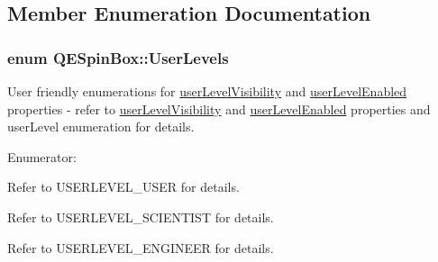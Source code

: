 \subsection{Member Enumeration Documentation}
\hypertarget{classQESpinBox_a27e69a31dc1ff8835542c057926b3eed}{
\subsubsection[{UserLevels}]{\setlength{\rightskip}{0pt plus 5cm}enum {\bf QESpinBox::UserLevels}}}
\label{classQESpinBox_a27e69a31dc1ff8835542c057926b3eed}
User friendly enumerations for \hyperlink{classQESpinBox_a36b8c4b73a3f918f967a45e370d53249}{userLevelVisibility} and \hyperlink{classQESpinBox_ab767d9e77fd21f19ad60ffc107f57253}{userLevelEnabled} properties -\/ refer to \hyperlink{classQESpinBox_a36b8c4b73a3f918f967a45e370d53249}{userLevelVisibility} and \hyperlink{classQESpinBox_ab767d9e77fd21f19ad60ffc107f57253}{userLevelEnabled} properties and userLevel enumeration for details. \begin{Desc}
\item[Enumerator: ]\par
\begin{description}
\item[{\em 
\hypertarget{classQESpinBox_a27e69a31dc1ff8835542c057926b3eeda238f8727a9ac147ae3a162e1f2dbd6c8}{
User}
\label{classQESpinBox_a27e69a31dc1ff8835542c057926b3eeda238f8727a9ac147ae3a162e1f2dbd6c8}
}]Refer to USERLEVEL\_\-USER for details. \item[{\em 
\hypertarget{classQESpinBox_a27e69a31dc1ff8835542c057926b3eedaaa99380701916297730c9b5dbe32055a}{
Scientist}
\label{classQESpinBox_a27e69a31dc1ff8835542c057926b3eedaaa99380701916297730c9b5dbe32055a}
}]Refer to USERLEVEL\_\-SCIENTIST for details. \item[{\em 
\hypertarget{classQESpinBox_a27e69a31dc1ff8835542c057926b3eeda750ffdebccb2a6d9e6af45842a2081bc}{
Engineer}
\label{classQESpinBox_a27e69a31dc1ff8835542c057926b3eeda750ffdebccb2a6d9e6af45842a2081bc}
}]Refer to USERLEVEL\_\-ENGINEER for details. \end{description}
\end{Desc}



